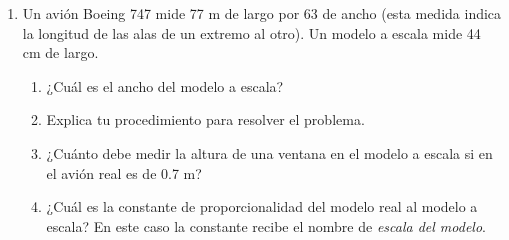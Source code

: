 \begin{enumerate}
    \item Un avión Boeing 747 mide 77 m de largo por 63 de ancho (esta medida
          indica la longitud de las alas de un extremo al otro). Un modelo a escala
          mide 44 cm de largo.
          \begin{enumerate}
              \item ¿Cuál es el ancho del modelo a escala?
              \item Explica tu procedimiento para resolver el problema.
              \item ¿Cuánto debe medir la altura de una ventana en el modelo a escala si en el avión
                    real es de 0.7 m?
              \item ¿Cuál es la constante de proporcionalidad del modelo real al modelo a escala?
                    En este caso la constante recibe el nombre de \emph{escala del modelo}.
          \end{enumerate}


\end{enumerate}
